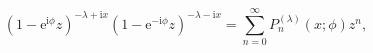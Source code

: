 \[(1-{\mathrm{e}}^{\mathrm{i}\phi}z)^{-\lambda+\mathrm{i}x}(1-{\mathrm{e}}^{-%
\mathrm{i}\phi}z)^{-\lambda-\mathrm{i}x}=\sum_{n=0}^{\infty}P^{(\lambda)}_{n}%
\left(x;\phi\right)z^{n},\]